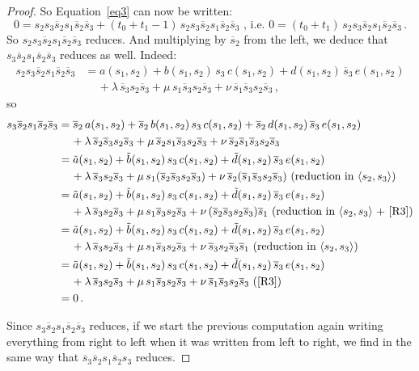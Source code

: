 \documentclass[12pt,reqno]{amsart}
\theoremstyle{definition}
\def\la{\langle}
\def\ra{\rangle}
\def\hs{\overline{s}}
\begin{document}
\begin{proof}
So Equation~\eqref{eq3} can now be written:
$$
0 = s_2 s_3 \hs_2 s_1 \hs_2 \hs_3 + (t_0 + t_1 - 1) \, s_2 s_3 \hs_2 s_1 \hs_2
\hs_3 \text{ , i.e. } 0 = (t_0 + t_1) \, s_2 s_3 \hs_2 s_1 \hs_2 \hs_3 \,.
$$
So $s_2 s_3 \hs_2 s_1 \hs_2 \hs_3$ reduces. And multiplying by $\hs_2$
from the left, we deduce that $s_3 \hs_2 s_1 \hs_2 \hs_3$ reduces as well. Indeed:
\begin{align*}
  s_2 s_3 \hs_2 s_1 \hs_2 \hs_3 & = a(s_1,s_2) + b(s_1,s_2) \, s_3 \,
  c(s_1,s_2) + d(s_1,s_2) \, \hs_3 \, e(s_1,s_2) \\
  &\phantom{sii} + \lambda \, \hs_3 s_2 \hs_3 + \mu \, s_1 \hs_3 s_2 \hs_3
  + \nu \, \hs_1 \hs_3 s_2 \hs_3 \,,
\end{align*}
so
\begin{align*}
  s_3 \hs_2 s_1 \hs_2 \hs_3 & = \hs_2 \, a(s_1,s_2) + \hs_2 \, b(s_1,s_2) \, s_3
  \, c(s_1,s_2) + \hs_2 \, d(s_1,s_2) \, \hs_3 \, e(s_1,s_2) \\
  &\phantom{sii} + \lambda \, \hs_2 \hs_3 s_2 \hs_3 + \mu \, \hs_2 s_1
  \hs_3 s_2 \hs_3 + \nu \, \hs_2 \hs_1 \hs_3 s_2 \hs_3 \\
  & =  \tilde{a}(s_1,s_2) +  \tilde{b}(s_1,s_2) \, s_3 \, c(s_1,s_2)
  + \tilde{d}(s_1,s_2) \, \hs_3 \, e(s_1,s_2) \\
  & \phantom{sii} + \lambda \, \hs_3 s_2 \hs_3 + \mu \, s_1 (\hs_2 \hs_3 s_2 \hs_3)
  + \nu \, \hs_2 (\hs_1 \hs_3 s_2 \hs_3) \text{ (reduction in $\la s_2,s_3\ra$)}\\
  &=  \tilde{a}(s_1,s_2) +  \tilde{b}(s_1,s_2) \, s_3 \, c(s_1,s_2)
  + \tilde{d}(s_1,s_2) \, \hs_3 \, e(s_1,s_2) \\
  & \phantom{sii} + \lambda \, \hs_3 s_2 \hs_3 + \mu \, s_1 \hs_3 s_2 \hs_3
  + \nu \, (\hs_2 \hs_3 s_2 \hs_3) \hs_1 \text{ (reduction in
$\la s_2,s_3\ra$ + \eqref{R3})} \\
  &=  \tilde{a}(s_1,s_2) +  \tilde{b}(s_1,s_2) \, s_3 \, c(s_1,s_2)
  + \tilde{d}(s_1,s_2) \, \hs_3 \, e(s_1,s_2) \\
  & \phantom{sii} + \lambda \, \hs_3 s_2 \hs_3 + \mu \, s_1 \hs_3 s_2 \hs_3
  + \nu \, \hs_3 s_2 \hs_3 \hs_1 \text{ (reduction in $\la s_2,s_3\ra$)} \\
  &=  \tilde{a}(s_1,s_2) +  \tilde{b}(s_1,s_2) \, s_3 \, c(s_1,s_2)
  + \tilde{d}(s_1,s_2) \, \hs_3 \, e(s_1,s_2) \\
  & \phantom{sii} + \lambda \, \hs_3 s_2 \hs_3 + \mu \, s_1 \hs_3 s_2 \hs_3
  + \nu \, \hs_1 \hs_3 s_2 \hs_3 \text{ (\eqref{R3})} \\
&= 0 \,.
\end{align*}

Since $s_3 \hs_2 s_1 \hs_2 \hs_3$ reduces, if we start the previous computation
again writing everything from right to left when it was written from left to
right, we find in the same way that $\hs_3 \hs_2 s_1 \hs_2 s_3$ reduces.
\end{proof}
\end{document}
